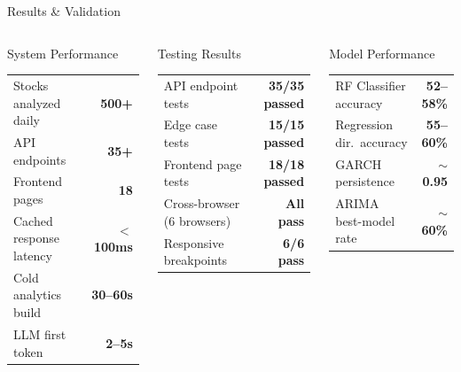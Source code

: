 \documentclass[aspectratio=169, 11pt]{beamer}
\begin{document}
\begin{frame}{Results \& Validation}
\begin{columns}[T]
\begin{block}{System Performance}
\footnotesize
\renewcommand{\arraystretch}{1.3}
\begin{tabular}{@{}l r@{}}
  Stocks analyzed daily & \textbf{500+} \\
  API endpoints & \textbf{35+} \\
  Frontend pages & \textbf{18} \\
  Cached response latency & \textbf{$<$ 100ms} \\
  Cold analytics build & \textbf{30--60s} \\
  LLM first token & \textbf{2--5s} \\
\end{tabular}
\end{block}

\vspace{0.1cm}
\begin{exampleblock}{Testing Results}
\footnotesize
\renewcommand{\arraystretch}{1.25}
\begin{tabular}{@{}l r@{}}
  API endpoint tests & \textbf{35/35 passed} \\
  Edge case tests & \textbf{15/15 passed} \\
  Frontend page tests & \textbf{18/18 passed} \\
  Cross-browser (6 browsers) & \textbf{All pass} \\
  Responsive breakpoints & \textbf{6/6 pass} \\
\end{tabular}
\end{exampleblock}

\begin{block}{Model Performance}
\footnotesize
\renewcommand{\arraystretch}{1.3}
\begin{tabular}{@{}l r@{}}
  RF Classifier accuracy & \textbf{52--58\%} \\
  Regression dir.\ accuracy & \textbf{55--60\%} \\
  GARCH persistence & \textbf{$\sim$0.95} \\
  ARIMA best-model rate & \textbf{$\sim$60\%} \\
\end{tabular}
\end{block}


\end{columns}
\end{frame}
\end{document}
